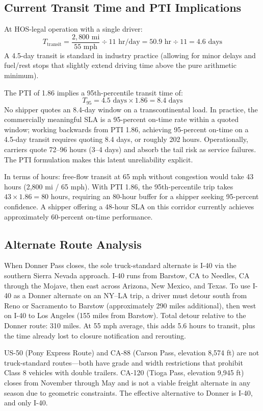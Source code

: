 \subsection{Current Transit Time and PTI Implications}

At HOS-legal operation with a single driver:
\begin{equation}
  T_{\text{transit}} = \frac{2{,}800 \text{ mi}}{55 \text{ mph}} \div 11 \text{ hr/day} = 50.9 \text{ hr} \div 11 = 4.6 \text{ days}
\end{equation}
A 4.5-day transit is standard in industry practice (allowing for minor delays and fuel/rest stops that slightly extend driving time above the pure arithmetic minimum).

The PTI of 1.86 implies a 95th-percentile transit time of:
\begin{equation}
  T_{95} = 4.5 \text{ days} \times 1.86 = 8.4 \text{ days}
\end{equation}
No shipper quotes an 8.4-day window on a transcontinental load. In practice, the commercially meaningful SLA is a 95-percent on-time rate within a quoted window; working backwards from PTI 1.86, achieving 95-percent on-time on a 4.5-day transit requires quoting 8.4 days, or roughly 202 hours. Operationally, carriers quote 72--96 hours (3--4 days) and absorb the tail risk as service failures. The PTI formulation makes this latent unreliability explicit.

In terms of hours: free-flow transit at 65 mph without congestion would take 43 hours (2,800 mi / 65 mph). With PTI 1.86, the 95th-percentile trip takes $43 \times 1.86 = 80$ hours, requiring an 80-hour buffer for a shipper seeking 95-percent confidence. A shipper offering a 48-hour SLA on this corridor currently achieves approximately 60-percent on-time performance.

\subsection{Alternate Route Analysis}

When Donner Pass closes, the sole truck-standard alternate is I-40 via the southern Sierra Nevada approach. I-40 runs from Barstow, CA to Needles, CA through the Mojave, then east across Arizona, New Mexico, and Texas. To use I-40 as a Donner alternate on an NY--LA trip, a driver must detour south from Reno or Sacramento to Barstow (approximately 290 miles additional), then west on I-40 to Los Angeles (155 miles from Barstow). Total detour relative to the Donner route: 310 miles. At 55 mph average, this adds 5.6 hours to transit, plus the time already lost to closure notification and rerouting.

US-50 (Pony Express Route) and CA-88 (Carson Pass, elevation 8,574 ft) are not truck-standard routes---both have grade and width restrictions that prohibit Class 8 vehicles with double trailers. CA-120 (Tioga Pass, elevation 9,945 ft) closes from November through May and is not a viable freight alternate in any season due to geometric constraints. The effective alternative to Donner is I-40, and only I-40.
